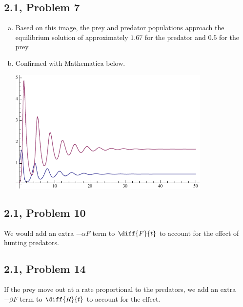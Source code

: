 \documentclass[10pt]{mypackage}
\begin{document}
\subsection{2.1, Problem 7}%
\begin{enumerate}[(a)]
  \item Based on this image, the prey and predator populations approach the equilibrium solution of approximately $1.67$ for the predator and $0.5$ for the prey.
  \item Confirmed with Mathematica below.
    \begin{center}
      \includegraphics[width=10cm]{images/2_1_7d.pdf}
    \end{center}
\end{enumerate}
\subsection{2.1, Problem 10}%
We would add an extra $-\alpha F$ term to $\diff{F}{t}$ to account for the effect of hunting predators.
\subsection{2.1, Problem 14}%
If the prey move out at a rate proportional to the predators, we add an extra $-\beta F$ term to $\diff{R}{t}$ to account for the effect.
\end{document}
